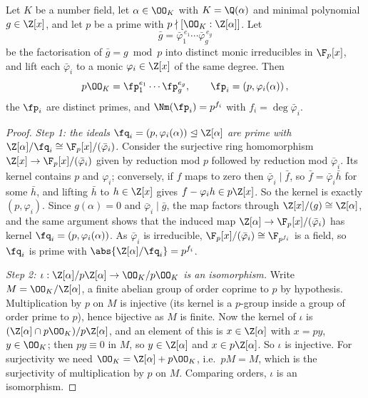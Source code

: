 \begin{theorem}\label{thm:dedekindcrit}
	Let $K$ be a number field, let $\alpha \in \OO_K$ with $K = \Q(\alpha)$ and minimal polynomial $g \in \Z[x]$, and let $p$ be a prime with $p \nmid [\OO_K : \Z[\alpha]]$. Let
	$$\bar g = \bar\varphi_1^{\,e_1}\cdots\bar\varphi_g^{\,e_g}$$
	be the factorisation of $\bar g = g \bmod p$ into distinct monic irreducibles in $\F_p[x]$, and lift each $\bar\varphi_i$ to a monic $\varphi_i \in \Z[x]$ of the same degree. Then
	$$p\OO_K = \fp_1^{e_1}\cdots\fp_g^{e_g}, \qquad \fp_i = \left(p, \varphi_i(\alpha)\right),$$
	the $\fp_i$ are distinct primes, and $\Nm(\fp_i) = p^{f_i}$ with $f_i = \deg\bar\varphi_i$.
\end{theorem}

\begin{proof}
	\emph{Step 1: the ideals $\fq_i = (p,\varphi_i(\alpha)) \trianglelefteq \Z[\alpha]$ are prime with $\Z[\alpha]/\fq_i \cong \F_p[x]/(\bar\varphi_i)$.} Consider the surjective ring homomorphism $\Z[x] \to \F_p[x]/(\bar\varphi_i)$ given by reduction mod $p$ followed by reduction mod $\bar\varphi_i$. Its kernel contains $p$ and $\varphi_i$; conversely, if $f$ maps to zero then $\bar\varphi_i \mid \bar f$, so $\bar f = \bar\varphi_i\bar h$ for some $\bar h$, and lifting $\bar h$ to $h \in \Z[x]$ gives $f - \varphi_i h \in p\Z[x]$. So the kernel is exactly $(p, \varphi_i)$. Since $g(\alpha) = 0$ and $\bar\varphi_i \mid \bar g$, the map factors through $\Z[x]/(g) \cong \Z[\alpha]$, and the same argument shows that the induced map $\Z[\alpha] \to \F_p[x]/(\bar\varphi_i)$ has kernel $\fq_i = (p,\varphi_i(\alpha))$. As $\bar\varphi_i$ is irreducible, $\F_p[x]/(\bar\varphi_i) \cong \F_{p^{f_i}}$ is a field, so $\fq_i$ is prime with $\abs{\Z[\alpha]/\fq_i} = p^{f_i}$.

	\emph{Step 2: $\iota : \Z[\alpha]/p\Z[\alpha] \to \OO_K/p\OO_K$ is an isomorphism.} Write $M = \OO_K/\Z[\alpha]$, a finite abelian group of order coprime to $p$ by hypothesis. Multiplication by $p$ on $M$ is injective (its kernel is a $p$-group inside a group of order prime to $p$), hence bijective as $M$ is finite. Now the kernel of $\iota$ is $(\Z[\alpha]\cap p\OO_K)/p\Z[\alpha]$, and an element of this is $x \in \Z[\alpha]$ with $x = py$, $y \in \OO_K$; then $py \equiv 0$ in $M$, so $y \in \Z[\alpha]$ and $x \in p\Z[\alpha]$. So $\iota$ is injective. For surjectivity we need $\OO_K = \Z[\alpha] + p\OO_K$, i.e.\ $pM = M$, which is the surjectivity of multiplication by $p$ on $M$. Comparing orders, $\iota$ is an isomorphism.


\end{proof}

